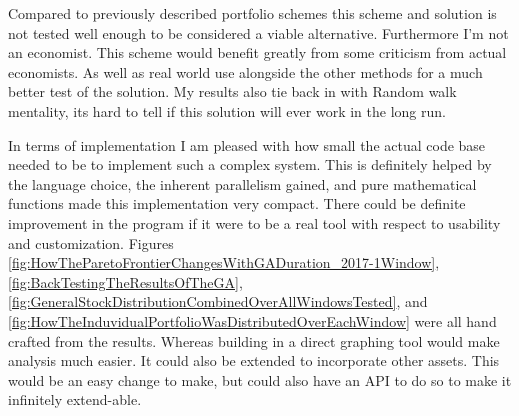 \documentclass[11pt]{article}
\begin{document}
    Compared to previously described portfolio schemes
    \cite{Markowitz, ValueAtRisk, Ghaoui, Robert, SidWard} this scheme and solution
    is not tested well enough to be considered a viable alternative. Furthermore
    I'm not an economist. This scheme would benefit greatly from some criticism
    from actual economists. As well as real world use alongside the other methods
    for a much better test of the solution. My results also tie back in with
    Random walk mentality, its hard to tell if this solution will ever
    work in the long run.

    In terms of implementation I am pleased with how small the actual code base needed to
    be to implement such a complex system. This is definitely helped by the language choice,
    the inherent parallelism gained, and pure mathematical functions made this
    implementation very compact. There could be definite improvement in the
    program if it were to be a real tool with respect to usability and customization. Figures
    \ref{fig:HowTheParetoFrontierChangesWithGADuration_2017-1Window},
    \ref{fig:BackTestingTheResultsOfTheGA},
    \ref{fig:GeneralStockDistributionCombinedOverAllWindowsTested}, and
    \ref{fig:HowTheInduvidualPortfolioWasDistributedOverEachWindow} were all hand
    crafted from the results. Whereas building in a direct graphing tool would make
    analysis much easier. It could also be extended to incorporate other assets.
    This would be an easy change to make, but could also have an API to do so
    to make it infinitely extend-able.

\pagebreak


\end{document}
